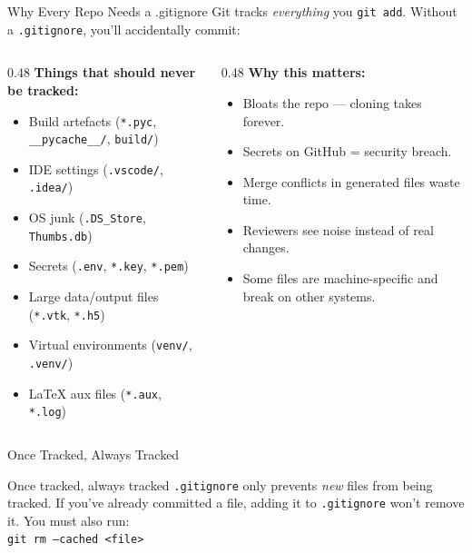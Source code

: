 \documentclass[aspectratio=169, 11pt]{beamer}
\begin{document}
\begin{frame}[fragile]{Why Every Repo Needs a .gitignore}
  Git tracks \emph{everything} you \texttt{git add}. Without a \texttt{.gitignore}, you'll accidentally commit:

  \vspace{0.3em}
  \begin{columns}[T]
    \begin{column}{0.48\textwidth}
      \textbf{Things that should never be tracked:}
      \begin{itemize}
        \item Build artefacts (\texttt{*.pyc}, \texttt{\_\_pycache\_\_/}, \texttt{build/})
        \item IDE settings (\texttt{.vscode/}, \texttt{.idea/})
        \item OS junk (\texttt{.DS\_Store}, \texttt{Thumbs.db})
        \item Secrets (\texttt{.env}, \texttt{*.key}, \texttt{*.pem})
        \item Large data/output files (\texttt{*.vtk}, \texttt{*.h5})
        \item Virtual environments (\texttt{venv/}, \texttt{.venv/})
        \item \LaTeX{} aux files (\texttt{*.aux}, \texttt{*.log})
      \end{itemize}
    \end{column}
    \begin{column}{0.48\textwidth}
      \textbf{Why this matters:}
      \begin{itemize}
        \item Bloats the repo --- cloning takes forever.
        \item Secrets on GitHub = security breach.
        \item Merge conflicts in generated files waste time.
        \item Reviewers see noise instead of real changes.
        \item Some files are machine-specific and break on other systems.
      \end{itemize}
    \end{column}
  \end{columns}
\end{frame}

\begin{frame}[fragile]{Once Tracked, Always Tracked}
  \vspace{0.5em}
  \begin{alertblock}{Once tracked, always tracked}
    \texttt{.gitignore} only prevents \emph{new} files from being tracked. If you've already committed a file, adding it to \texttt{.gitignore} won't remove it. You must also run:\\
    \texttt{git rm --cached <file>}
  \end{alertblock}
\end{frame}
\end{document}
